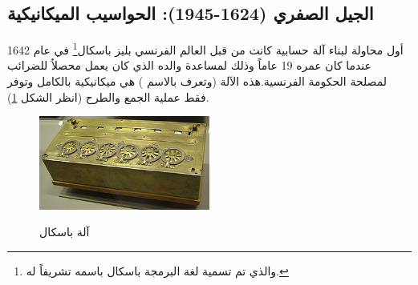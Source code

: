 \documentclass[document.tex]{subfiles}
\begin{document}
\subsection{الجيل الصفري (1624-1945): الحواسيب الميكانيكية}
أول محاولة لبناء آلة حسابية كانت من قبل العالم الفرنسي بليز باسكال\footnote{والذي تم تسمية لغة البرمجة باسكال باسمه تشريفاً له.} في عام 1642 عندما كان عمره 19 عاماً وذلك لمساعدة والده الذي كان يعمل محصلاُ للضرائب لمصلحة الحكومة الفرنسية.هذه الآلة (وتعرف بالاسم ) هي ميكانيكية بالكامل وتوفر فقط عملية الجمع والطرح (انظر الشكل \ref{fig:Pascaline}).

\begin{figure}[h!] 
  \caption{آلة باسكال}
  \centering
   \includegraphics[width=0.5\textwidth]{../img/Pascaline}
 \label{fig:Pascaline} 
\end{figure}
\end{document}
